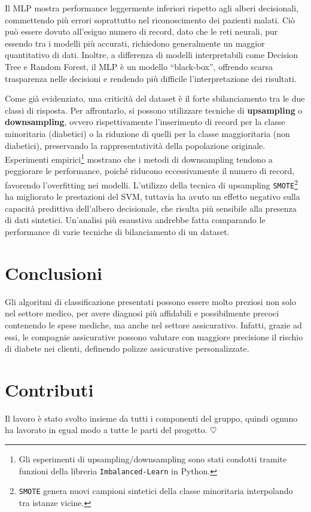 \documentclass[conference]{IEEEtran}
\begin{document}
 Il MLP mostra performance leggermente inferiori rispetto agli alberi decisionali, commettendo più errori  soprattutto nel riconoscimento dei pazienti malati. Ciò può essere dovuto all’esiguo numero di record, dato che le reti neurali, pur essendo tra i modelli più accurati, richiedono generalmente un maggior quantitativo di dati. 
 Inoltre, a differenza di modelli interpretabili come Decision Tree e Random Forest, il MLP è un modello “black-box”, offrendo scarsa trasparenza nelle decisioni e rendendo più difficile l’interpretazione dei risultati.


Come già evidenziato, una criticità del dataset è il forte sbilanciamento tra le due classi di risposta. Per affrontarlo, si possono utilizzare tecniche di \textbf{upsampling} o \textbf{downsampling}, ovvero rispettivamente l’inserimento di record per la classe minoritaria (diabetici) o la riduzione di quelli per la classe maggioritaria (non diabetici), preservando la rappresentatività della popolazione originale.
Esperimenti empirici\footnote{Gli esperimenti di upsampling/downsampling sono stati condotti tramite funzioni della libreria \texttt{Imbalanced-Learn} in Python.} mostrano che i metodi di downsampling tendono a peggiorare le performance, poiché riducono eccessivamente il numero di record, favorendo l’overfitting nei modelli. L’utilizzo della tecnica di upsampling \texttt{SMOTE}\footnote{\texttt{SMOTE} genera nuovi campioni sintetici della classe minoritaria interpolando tra istanze vicine.} ha migliorato le prestazioni del SVM, tuttavia ha avuto un effetto negativo sulla capacità predittiva dell’albero decisionale, che risulta più sensibile alla presenza di dati sintetici. Un'analisi più esaustiva andrebbe fatta comparando le performance di varie tecniche di bilanciamento di un dataset.


\section{Conclusioni}
Gli algoritmi di classificazione presentati possono essere molto preziosi non solo nel settore medico, per avere diagnosi più affidabili e possibilmente precoci contenendo le spese mediche, ma anche nel settore assicurativo. Infatti, grazie ad essi, le compagnie assicurative possono valutare con maggiore precisione il rischio di diabete nei clienti, definendo polizze assicurative personalizzate. 

\section{Contributi}
Il lavoro è stato svolto insieme da tutti i componenti del gruppo, quindi ognuno ha lavorato in egual modo a tutte le parti del progetto. $\heartsuit$
\end{document}
